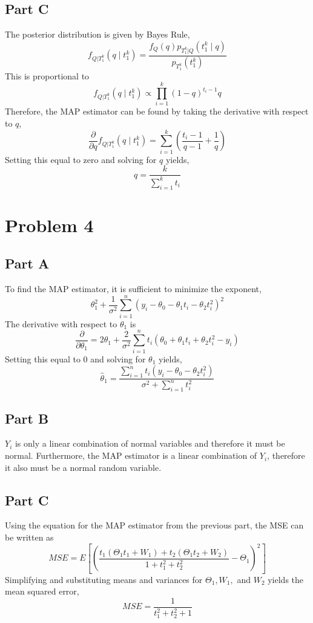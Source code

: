 \documentclass{article}
\begin{document}
\subsection*{Part C}

The posterior distribution is given by Bayes Rule,
$$ f_{Q|T_1^k} (q \mid t_1^k) = \frac{f_Q(q) p_{T_1^k|Q}(t_1^k \mid
q)}{p_{T_1^k}(t_1^k)} $$
This is proportional to
$$ f_{Q|T_1^k} (q \mid t_1^k) \propto \prod\limits_{i = 1}^k (1 - q)^{t_i -
1} q $$
Therefore, the MAP estimator can be found by taking the derivative with
respect to $q$,
$$ \frac{\partial}{\partial q} f_{Q|T_1^k} (q \mid t_1^k) = \sum\limits_{i =
1}^k \left(\frac{t_i - 1}{q - 1} + \frac{1}{q}\right) $$
Setting this equal to zero and solving for $q$ yields,
$$ q = \frac{k}{\sum_{i = 1}^k t_i} $$

\section*{Problem 4}

\subsection*{Part A}

To find the MAP estimator, it is sufficient to minimize the exponent,
$$ \theta_1^2 + \frac{1}{\sigma^2}\sum\limits_{i = 1}^{n}\left(y_i - \theta_0
- \theta_1 t_i - \theta_2 t_i^2\right)^2 $$
The derivative with respect to $\theta_1$ is
$$ \frac{\partial}{\partial \theta_1} = 2 \theta_1 + \frac{2}{\sigma^2}
\sum\limits_{i = 1}^{n} t_i \left(\theta_0 + \theta_1 t_i + \theta_2 t_i^2 -
y_i \right) $$
Setting this equal to $0$ and solving for $\theta_1$ yields,
$$ \hat{\theta}_1 = \frac{\sum_{i = 1}^n t_i \left(y_i - \theta_0 - \theta_2
t_i^2\right)}{\sigma^2 + \sum_{i = 1}^n t_i^2} $$

\subsection*{Part B}

$Y_i$ is only a linear combination of normal variables and therefore it must
be normal. Furthermore, the MAP estimator is a linear combination of $Y_i$,
therefore it also must be a normal random variable.

\subsection*{Part C}

Using the equation for the MAP estimator from the previous part, the MSE can
be written as
$$ MSE = E\left[\left(\frac{t_1 (\Theta_1 t_1 + W_1) + t_2 (\Theta_1 t_2 +
W_2)}{1 + t_1^2 + t_2^2} - \Theta_1\right)^2\right] $$
Simplifying and substituting means and variances for $\Theta_1, W_1,$ and
$W_2$ yields the mean squared error,
$$ MSE = \frac{1}{t_1^2 + t_2^2 + 1} $$
\end{document}
